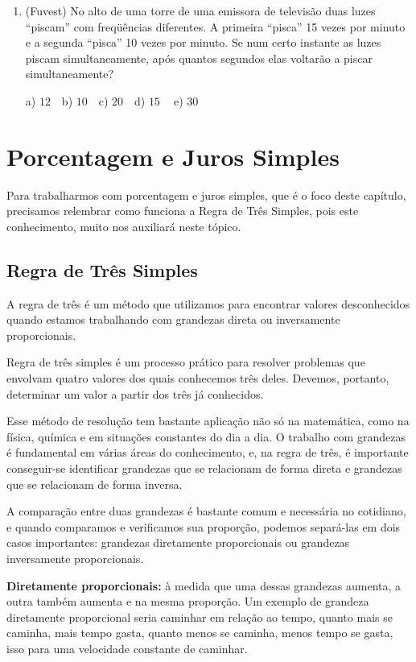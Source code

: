 \begin{multicols*}{2}
\begin{enumerate}
        \item (Fuvest) No alto de uma torre de uma emissora de televisão duas luzes “piscam” com freqüências diferentes. A primeira “pisca” 15 vezes por minuto e a segunda “pisca” 10 vezes por minuto. Se num certo instante as luzes piscam simultaneamente, após quantos segundos elas voltarão a piscar simultaneamente?

              a) $12 \ \ \ $ b) $10 \ \ \ $ c) $20 \ \ \ $ d) $15 \ \ \ \ $ e) $30 \ \ $

    \end{enumerate}

    \section*{Porcentagem e Juros Simples}

    Para trabalharmos com porcentagem e juros simples, que é o foco deste capítulo, precisamos relembrar como funciona a Regra de Três Simples, pois este conhecimento, muito nos auxiliará neste tópico.

    \subsection{Regra de Três Simples}

    A regra de três é um método que utilizamos para encontrar valores desconhecidos quando estamos trabalhando com grandezas direta ou inversamente proporcionais.

    Regra de três simples é um processo prático para resolver problemas que envolvam quatro valores dos quais conhecemos três deles. Devemos, portanto, determinar um valor a partir dos três já conhecidos.

    Esse método de resolução tem bastante aplicação não só na matemática, como na física, química e em situações constantes do dia a dia. O trabalho com grandezas é fundamental em várias áreas do conhecimento, e, na regra de três, é importante conseguir-se identificar grandezas que se relacionam de forma direta e grandezas que se relacionam de forma inversa.

    A comparação entre duas grandezas é bastante comum e necessária no cotidiano, e quando comparamos e verificamos sua proporção, podemos separá-las em dois casos importantes: grandezas diretamente proporcionais ou grandezas inversamente proporcionais.

    \textbf{Diretamente proporcionais:} à medida que uma dessas grandezas aumenta, a outra também aumenta e na mesma proporção. Um exemplo de grandeza diretamente proporcional seria caminhar em relação ao tempo, quanto mais se caminha, mais tempo gasta, quanto menos se caminha, menos tempo se gasta, isso para uma velocidade constante de caminhar.


\end{multicols*}
